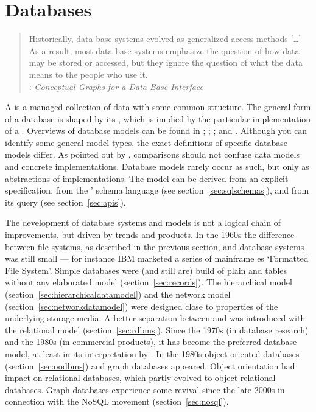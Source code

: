 \section{Databases}
\label{sec:databases}

\begin{quotation}%
Historically, data base systems evolved as generalized access methods [\ldots]
As a result, most data base systems emphasize the question of how data may be
stored or accessed, but they ignore the question of what the data means to the
people who use it.\\
\quotationsource {} \citeyear{Sowa1976}: 
\textit{Conceptual Graphs for a Data Base Interface}
\end{quotation}

\noindent
A  is a managed collection of data with some common structure.
The general form of a database is shaped by its , which
is implied by the particular implementation of a . Overviews of database models can be found in 
\textcite{Silberschatz2010}; \textcite{Elmasri2010}; \textcite{Navathe1992};
and \textcite{Kerschberg1976}. Although you can identify some general model
types, the exact definitions of specific database models differ. As pointed 
out by \textcite[chapter 9]{Kent1978}, comparisons should not confuse data models 
and concrete implementations. Database models rarely occur as such, but only 
as abstractions of  implementations. The model can be derived from 
an explicit specification, from the ' schema language
(see section~\ref{sec:sqlschemas}), and from its query  (see 
section~\ref{sec:apis}).


The development of database systems and models is not a logical chain of
improvements, but driven by trends and products. In the 1960s the difference
between file systems, as described in the previous section, and database systems 
was still small --- for instance IBM marketed a series of mainframe es
`Formatted File System'. Simple databases were (and still are) build of plain
 and tables without any elaborated model
(section~\ref{sec:records}). The hierarchical model (section~\ref{sec:hierarchicaldatamodel})
and the network model (section~\ref{sec:networkdatamodel}) were designed close to
properties of the underlying storage media. A better separation between
 and  was introduced with the
relational model (section~\ref{sec:rdbms}). Since the 1970s (in database research) and
the 1980s (in commercial products), it has become the preferred database model, 
at least in its interpretation by . In the 1980s object oriented
databases (section~\ref{sec:oodbms}) and graph databases appeared. Object orientation
had impact on relational databases, which partly evolved to object-relational
databases. Graph databases experience some revival since the late 2000s in
connection with the NoSQL movement (section~\ref{sec:nosql}).

